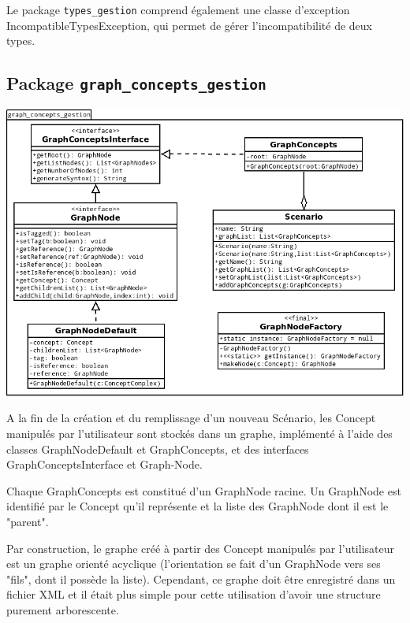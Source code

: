 \documentclass[12pt]{report}
\begin{document}
\bigskip

Le package \texttt{types\_gestion} comprend également une classe d'exception IncompatibleTypesException, qui permet de gérer l'incompatibilité de deux types.

\subsection{Package \texttt{graph\_concepts\_gestion}}

\begin{center}
\includegraphics[scale=0.5]{DiagLinguistic_graph_concepts_gestion.png}
\end{center}

A la fin de la création et du remplissage d'un nouveau Scénario, les Concept manipulés par l'utilisateur sont stockés dans un graphe, implémenté à l'aide des classes GraphNodeDefault et GraphConcepts, et des interfaces GraphConceptsInterface et Graph-Node.

Chaque GraphConcepts est constitué d'un GraphNode racine. Un GraphNode est identifié par le Concept qu'il représente et la liste des GraphNode dont il est le "parent".

\bigskip

Par construction, le graphe créé à partir des Concept manipulés par l'utilisateur est un graphe orienté acyclique (l'orientation se fait d'un GraphNode vers ses "fils", dont il possède la liste). Cependant, ce graphe doit être enregistré dans un fichier XML et il était plus simple pour cette utilisation d'avoir une structure purement arborescente. 
\end{document}
